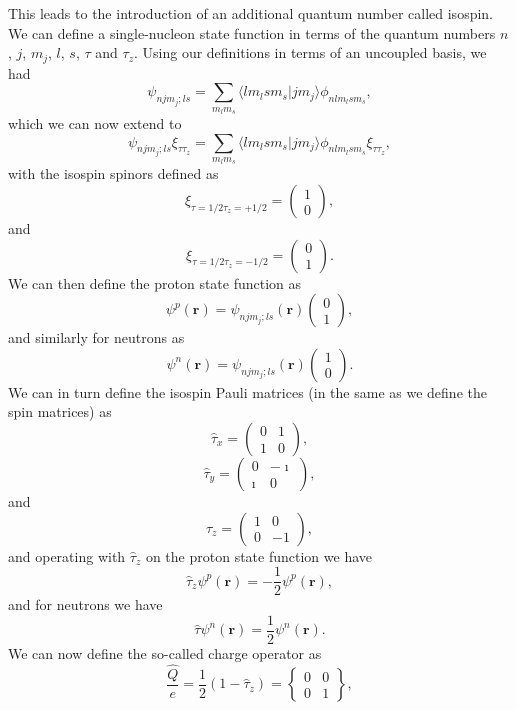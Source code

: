 \documentclass[graybox,sectrefs,envcountresetchap,open=right]{svmonodo}
\begin{document}
This leads to the introduction of an additional quantum number called isospin.
We can define a single-nucleon
state function in terms of the quantum numbers $n$, $j$, $m_j$, $l$, $s$, $\tau$ and $\tau_z$. Using our definitions in terms of an uncoupled basis, we had 
\[
\psi_{njm_j;ls}=\sum_{m_lm_s}\langle lm_lsm_s|jm_j\rangle\phi_{nlm_lsm_s},
\]
which we can now extend to
\[
\psi_{njm_j;ls}\xi_{\tau\tau_z}=\sum_{m_lm_s}\langle lm_lsm_s|jm_j\rangle\phi_{nlm_lsm_s}\xi_{\tau\tau_z},
\]
with the isospin spinors defined as 
\[
\xi_{\tau=1/2\tau_z=+1/2}=\left(\begin{array}{c} 1  \\ 0\end{array}\right),
\]
and
\[
\xi_{\tau=1/2\tau_z=-1/2}=\left(\begin{array}{c} 0  \\ 1\end{array}\right).
\]
We can then define the proton state function as 
\[
\psi^p(\mathbf{r})  =\psi_{njm_j;ls}(\mathbf{r})\left(\begin{array}{c} 0  \\ 1\end{array}\right), 
\]
and similarly for neutrons as
\[
\psi^n(\mathbf{r})  =\psi_{njm_j;ls}(\mathbf{r})\left(\begin{array}{c} 1  \\ 0\end{array}\right). 
\]
We can in turn define the isospin Pauli matrices (in the same as we define the spin matrices) as
\[
\hat{\tau}_x =\left(\begin{array}{cc} 0 & 1 \\ 1 & 0 \end{array}\right),
\]
\[
\hat{\tau}_y =\left(\begin{array}{cc} 0 & -\imath \\ \imath & 0 \end{array}\right),
\]
and
\[
\hat{\tau}_z =\left(\begin{array}{cc} 1 & 0 \\ 0 & -1 \end{array}\right),
\]
and operating with $\hat{\tau}_z$ on the proton state function we have
\[
\hat{\tau}_z\psi^p(\mathbf{r})=-\frac{1}{2}\psi^p(\mathbf{r}),
\]
and for neutrons we have
\[
\hat{\tau}\psi^n(\mathbf{r})=\frac{1}{2}\psi^n(\mathbf{r}).
\]
We can now define the so-called charge operator as 
\[
\frac{\hat{Q}}{e} = \frac{1}{2}\left(1-\hat{\tau}_z\right)=\begin{Bmatrix} 0 & 0 \\ 0 & 1 \end{Bmatrix},
\]
\end{document}
